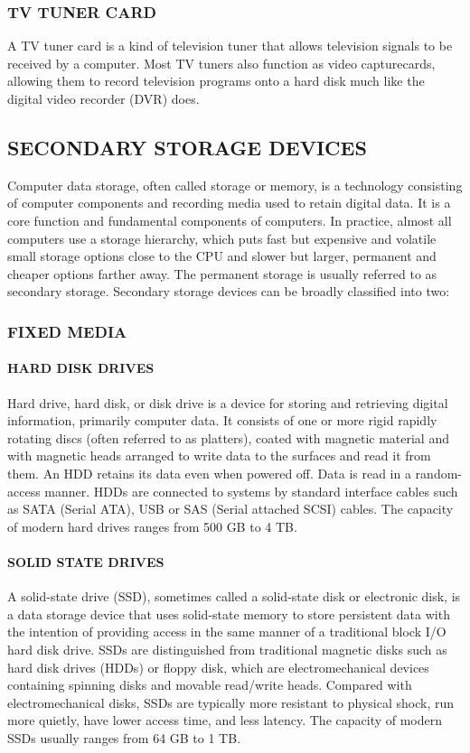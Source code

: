\documentclass[a4paper,28pt]{report}
\begin{document}
\subsubsection*{TV TUNER CARD}
	 A TV tuner card is a kind of television tuner that allows television signals to be received by
	a computer. Most TV tuners also function as video capturecards, allowing them to record television
	programs onto a hard disk much like the digital video recorder (DVR) does.
\subsection*{SECONDARY STORAGE DEVICES}
	Computer data storage, often called storage or memory, is a technology consisting of computer components
	and recording media used to retain digital data. It is a core function and fundamental components of
	computers. In practice, almost all computers use a storage hierarchy, which puts fast but expensive and volatile
	small storage options close to the CPU and slower but larger, permanent and cheaper options farther away. The
	permanent storage is usually referred to as secondary storage. Secondary storage devices can be broadly
	classified into two:
\subsubsection*{FIXED MEDIA}
	\paragraph{HARD DISK DRIVES}
	  Hard drive, hard disk, or disk drive is a device for
	storing and retrieving digital information, primarily computer data. It consists of one or more rigid rapidly rotating discs (often referred to as platters), coated with magnetic material and
	with magnetic heads arranged to write data to the surfaces and read it from them. An HDD retains its
	data even when powered off. Data is read in a random-access manner. HDDs are
	connected to systems by standard interface cables such as SATA (Serial ATA), USB or SAS (Serial
	attached SCSI) cables. The capacity of modern hard drives ranges from 500 GB to 4 TB.
	\paragraph{SOLID STATE DRIVES}
	A solid-state drive (SSD), sometimes called a solid-state disk or electronic disk, is a
	data storage device that uses solid-state memory to store persistent data with the intention of providing
	access in the same manner of a traditional block I/O hard disk drive. SSDs are distinguished from
	traditional magnetic disks such as hard disk drives (HDDs) or floppy disk, which are electromechanical
	devices containing spinning disks and movable read/write heads. Compared with electromechanical
	disks, SSDs are typically more resistant to physical shock, run more quietly, have lower access time,
	and less latency. The capacity of modern
	SSDs usually ranges from 64 GB to 1 TB.
\end{document}
